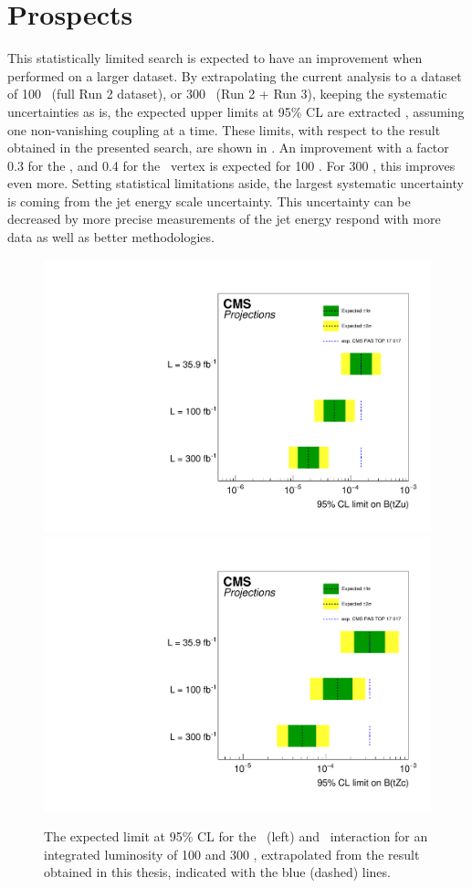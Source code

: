 \section{Prospects}
This statistically limited search is expected to have an improvement when performed on a larger dataset. By extrapolating the current analysis to a dataset of 100 \fbinv\ (full Run 2 dataset), or 300 \fbinv\ (Run 2 + Run 3), keeping the systematic uncertainties as is,  the expected upper limits at 95\% CL are  extracted %
, assuming one non-vanishing coupling at a time. These limits, with respect to the result obtained in the presented search, are shown in .  An improvement with a factor 0.3 for the \Zut, and 0.4 for the \Zct\ vertex is expected for 100 \fbinv. For 300 \fbinv, this improves even more. Setting statistical limitations aside, the largest systematic uncertainty is coming from the jet energy scale uncertainty. This uncertainty can be decreased by more precise measurements of the jet energy respond with more data as well as better methodologies. %
\begin{figure}
	\centering
	\includegraphics[width=0.49\linewidth]{7_Conclusion/Figures/TOP-17-017_limitsZutProj.pdf}
	\includegraphics[width=0.49\linewidth]{7_Conclusion/Figures/TOP-17-017_limitsZctproj.pdf}
	\caption{The expected limit at 95\% CL for the \Zut\ (left) and \Zct\ interaction for an integrated luminosity of 100 and 300 \fbinv, extrapolated from the result obtained in this thesis, indicated with the blue (dashed) lines. }
	\label{fig:proj}
\end{figure}


